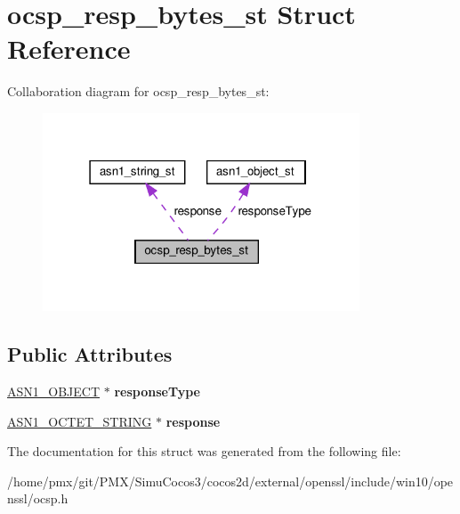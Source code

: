 \hypertarget{structocsp__resp__bytes__st}{}\section{ocsp\+\_\+resp\+\_\+bytes\+\_\+st Struct Reference}
\label{structocsp__resp__bytes__st}


Collaboration diagram for ocsp\+\_\+resp\+\_\+bytes\+\_\+st\+:
\nopagebreak
\begin{figure}[H]
\begin{center}
\leavevmode
\includegraphics[width=267pt]{structocsp__resp__bytes__st__coll__graph}
\end{center}
\end{figure}
\subsection*{Public Attributes}
\begin{DoxyCompactItemize}
\item 
\mbox{\label{structocsp__resp__bytes__st_a304d3f8cf4f98279dca0624763ce8b01}} 
\hyperlink{structasn1__object__st}{A\+S\+N1\+\_\+\+O\+B\+J\+E\+CT} $\ast$ {\bfseries response\+Type}
\item 
\mbox{\label{structocsp__resp__bytes__st_a98f9926c70716d7d4438aa7e87d17649}} 
\hyperlink{structasn1__string__st}{A\+S\+N1\+\_\+\+O\+C\+T\+E\+T\+\_\+\+S\+T\+R\+I\+NG} $\ast$ {\bfseries response}
\end{DoxyCompactItemize}


The documentation for this struct was generated from the following file\+:\begin{DoxyCompactItemize}
\item 
/home/pmx/git/\+P\+M\+X/\+Simu\+Cocos3/cocos2d/external/openssl/include/win10/openssl/ocsp.\+h\end{DoxyCompactItemize}
